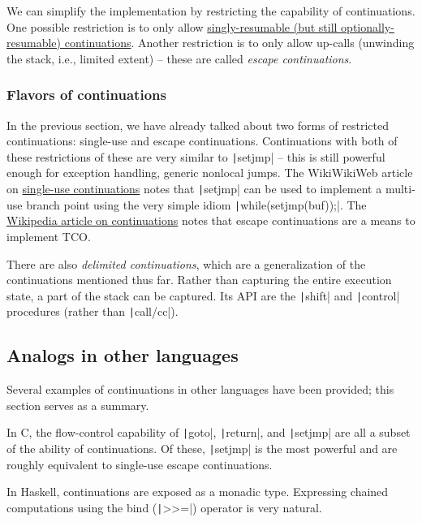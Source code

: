 \documentclass[]{article}
\begin{document}
We can simplify the implementation by restricting the capability of continuations. One possible restriction is to only allow \href{http://c2.com/wiki/remodel/?SingleUseContinuation}{singly-resumable (but still optionally-resumable) continuations}. Another restriction is to only allow up-calls (unwinding the stack, i.e., limited extent) -- these are called \textit{escape continuations}.

\subsubsection{Flavors of continuations}
\label{sec:flav}

In the previous section, we have already talked about two forms of restricted continuations: single-use and escape continuations. Continuations with both of these restrictions of these are very similar to \texttt|setjmp| -- this is still powerful enough for exception handling, generic nonlocal jumps. The WikiWikiWeb article on \href{http://c2.com/wiki/remodel/?SingleUseContinuation}{single-use continuations} notes that \texttt|setjmp| can be used to implement a multi-use branch point using the very simple idiom \texttt|while(setjmp(buf));|. The \href{https://en.wikipedia.org/wiki/Continuation#Kinds}{Wikipedia article on continuations} notes that escape continuations are a means to implement TCO.

There are also \textit{delimited continuations}, which are a generalization of the continuations mentioned thus far. Rather than capturing the entire execution state, a part of the stack can be captured. Its API are the \texttt|shift| and \texttt|control| procedures (rather than \texttt|call/cc|).

\subsection{Analogs in other languages}
\label{sec:anal}

Several examples of continuations in other languages have been provided; this section serves as a summary.

In C, the flow-control capability of \texttt|goto|, \texttt|return|, and \texttt|setjmp| are all a subset of the ability of continuations. Of these, \texttt|setjmp| is the most powerful and are roughly equivalent to single-use escape continuations.

In Haskell, continuations are exposed as a monadic type. Expressing chained computations using the bind (\texttt|>>=|) operator is very natural.
\end{document}
